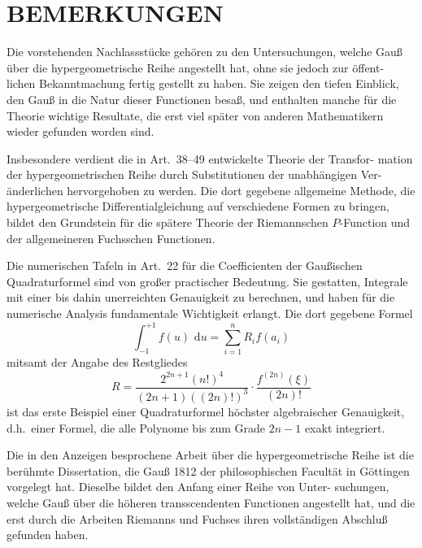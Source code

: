 \documentclass[12pt,a4paper]{article}
\newcommand{\dd}{\,\mathrm{d}}
\begin{document}
\section*{BEMERKUNGEN}


Die vorstehenden Nachlassstücke gehören zu den Untersuchungen, welche
Gauß über die hypergeometrische Reihe angestellt hat, ohne sie jedoch zur öffent-
lichen Bekanntmachung fertig gestellt zu haben. Sie zeigen den tiefen Einblick,
den Gauß in die Natur dieser Functionen besaß, und enthalten manche für die
Theorie wichtige Resultate, die erst viel später von anderen Mathematikern wieder
gefunden worden sind.

Insbesondere verdient die in Art.\ 38--49 entwickelte Theorie der Transfor-
mation der hypergeometrischen Reihe durch Substitutionen der unabhängigen Ver-
änderlichen hervorgehoben zu werden. Die dort gegebene allgemeine Methode,
die hypergeometrische Differentialgleichung auf verschiedene Formen zu bringen,
bildet den Grundstein für die spätere Theorie der Riemannschen $P$-Function und
der allgemeineren Fuchsschen Functionen.

Die numerischen Tafeln in Art.\ 22 für die Coefficienten der Gaußischen
Quadraturformel sind von großer practischer Bedeutung. Sie gestatten, Integrale
mit einer bis dahin unerreichten Genauigkeit zu berechnen, und haben für die
numerische Analysis fundamentale Wichtigkeit erlangt. Die dort gegebene Formel
\[
\int_{-1}^{+1} f(u) \, \dd u = \sum_{i=1}^{n} R_i f(a_i)
\]
mitsamt der Angabe des Restgliedes
\[
R = \frac{2^{2n+1}(n!)^4}{(2n+1)((2n)!)^3} \cdot \frac{f^{(2n)}(\xi)}{(2n)!}
\]
ist das erste Beispiel einer Quadraturformel höchster algebraischer Genauigkeit,
d.h.\ einer Formel, die alle Polynome bis zum Grade $2n-1$ exakt integriert.

Die in den Anzeigen besprochene Arbeit über die hypergeometrische Reihe
ist die berühmte Dissertation, die Gauß 1812 der philosophischen Facultät in
Göttingen vorgelegt hat. Dieselbe bildet den Anfang einer Reihe von Unter-
suchungen, welche Gauß über die höheren transscendenten Functionen angestellt
hat, und die erst durch die Arbeiten Riemanns und Fuchses ihren vollständigen
Abschluß gefunden haben.

\end{document}
